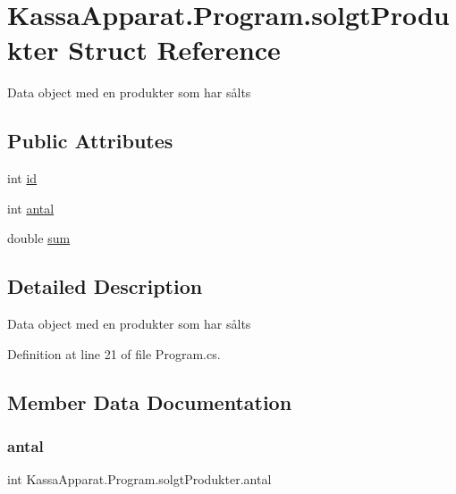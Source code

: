 \hypertarget{struct_kassa_apparat_1_1_program_1_1solgt_produkter}{}\section{Kassa\+Apparat.\+Program.\+solgt\+Produkter Struct Reference}
\label{struct_kassa_apparat_1_1_program_1_1solgt_produkter}


Data object med en produkter som har sålts  


\subsection*{Public Attributes}
\begin{DoxyCompactItemize}
\item 
int \mbox{\hyperlink{struct_kassa_apparat_1_1_program_1_1solgt_produkter_a0063dc7c2f978c801af3fe665e08c8d7}{id}}
\item 
int \mbox{\hyperlink{struct_kassa_apparat_1_1_program_1_1solgt_produkter_a25a2fd9fd6485aedd0549d0cee20a20e}{antal}}
\item 
double \mbox{\hyperlink{struct_kassa_apparat_1_1_program_1_1solgt_produkter_a585555c69997402c531c9522123e5df0}{sum}}
\end{DoxyCompactItemize}


\subsection{Detailed Description}
Data object med en produkter som har sålts 



Definition at line 21 of file Program.\+cs.



\subsection{Member Data Documentation}
\mbox{\label{struct_kassa_apparat_1_1_program_1_1solgt_produkter_a25a2fd9fd6485aedd0549d0cee20a20e}} 
\subsubsection{\texorpdfstring{antal}{antal}}
{\footnotesize\ttfamily int Kassa\+Apparat.\+Program.\+solgt\+Produkter.\+antal}



